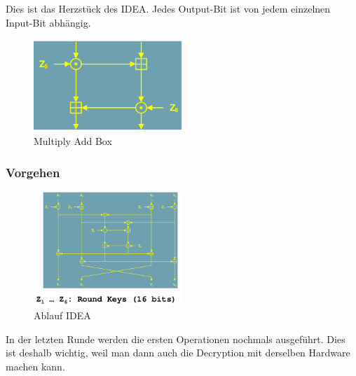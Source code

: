 Dies ist das Herzstück des IDEA. Jedes Output-Bit ist von jedem
einzelnen Input-Bit abhängig.

\begin{figure}[H]
\centering
\includegraphics[width=0.5\textwidth]{figures/ideaMultiplyAddBox.png}
\caption{Multiply Add Box}
\end{figure}

\hypertarget{vorgehen}{%
\subsubsection{Vorgehen}\label{vorgehen}}

\begin{figure}[H]
\centering
\includegraphics[width=0.5\textwidth]{figures/ideaAblauf.png}
\caption{Ablauf IDEA}
\end{figure}

In der letzten Runde werden die ersten Operationen nochmals ausgeführt.
Dies ist deshalb wichtig, weil man dann auch die Decryption mit
derselben Hardware machen kann.

\clearpage
